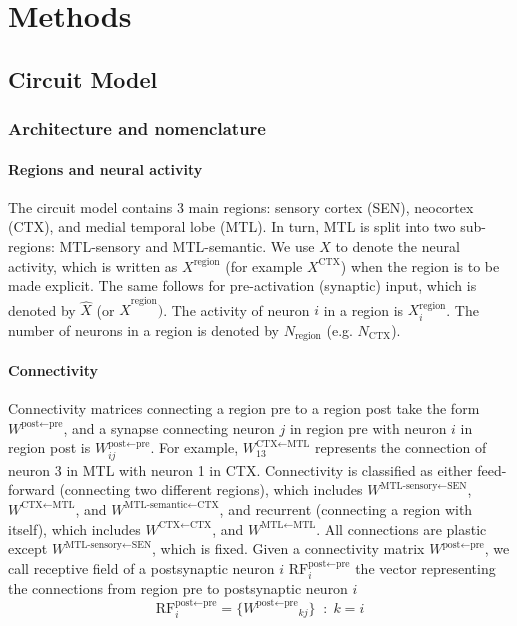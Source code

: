 \documentclass{article}
\begin{document}
\section*{Methods}\label{methods}
\subsection*{Circuit Model}
\subsubsection*{Architecture and nomenclature}
\paragraph*{Regions and neural activity}
The circuit model contains 3 main regions: sensory cortex (SEN), neocortex (CTX), and medial temporal lobe (MTL). In turn, MTL is split into two sub-regions: MTL-sensory and MTL-semantic. We use $X$ to denote the neural activity, which is written as $X^\textrm{region}$ (for example $X^\textrm{CTX}$) when the region is to be made explicit. The same follows for pre-activation (synaptic) input, which is denoted by $\hat{X}$ (or $\hat{X}^\textrm{region})$. The activity of neuron $i$ in a region is $X^\textrm{region}_i$. The number of neurons in a region is denoted by $N_\textrm{region}$ (e.g. $N_\textrm{CTX}$).
\paragraph{Connectivity}
Connectivity matrices connecting a region \textrm{pre} to a region \textrm{post} take the form $W^{\textrm{post}\leftarrow\textrm{pre}}$, and a synapse connecting neuron $j$ in region pre with neuron $i$ in region post is $W^{\textrm{post}\leftarrow\textrm{pre}}_{ij}$. For example, $W^{\textrm{CTX}\leftarrow\textrm{MTL}}_{13}$ represents the connection of neuron 3 in MTL with neuron 1 in CTX. Connectivity is classified as either feed-forward (connecting two different regions), which includes  $W^{\textrm{MTL-sensory}\leftarrow\textrm{SEN}}$, $W^{\textrm{CTX}\leftarrow\textrm{MTL}}$, and $W^{\textrm{MTL-semantic}\leftarrow\textrm{CTX}}$, and recurrent (connecting a region with itself), which includes $W^{\textrm{CTX}\leftarrow\textrm{CTX}}$, and $W^{\textrm{MTL}\leftarrow\textrm{MTL}}$. All connections are plastic except $W^{\textrm{MTL-sensory}\leftarrow\textrm{SEN}}$, which is fixed. Given a connectivity matrix $W^{\textrm{post}\leftarrow\textrm{pre}}$, we call receptive field of a postsynaptic neuron $i$ $\textrm{RF}^{\textrm{post}\leftarrow\textrm{pre}}_i$ the vector representing the connections from region pre to postsynaptic neuron $i$
\begin{equation}
    \textrm{RF}^{\textrm{post}\leftarrow\textrm{pre}}_i = \{{W^{\textrm{post}\leftarrow\textrm{pre}}}_{kj}\} \;\; : \;k = i 
\end{equation}
\end{document}
